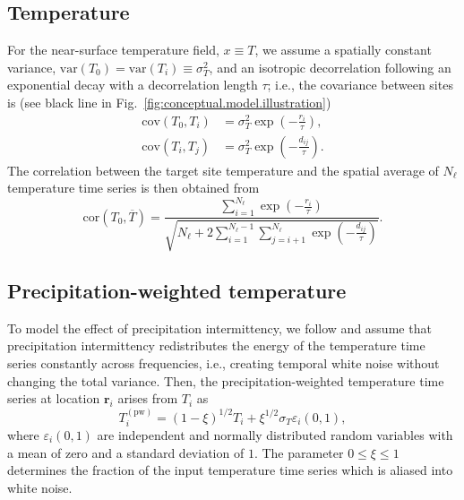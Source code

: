 \documentclass[cp, manuscript]{copernicus}
\begin{document}
\subsection{Temperature}
\label{app:concept.model.t2m}

For the near-surface temperature field, $x \equiv T$, we assume a spatially
constant variance, $\mathrm{var}(T_0)=\mathrm{var}(T_i)\equiv\sigma_T^2$, and an
isotropic decorrelation following an exponential decay with a decorrelation
length $\tau$; i.e., the covariance between sites is (see black line in
Fig.~\ref{fig:conceptual.model.illustration})
%
\begin{align}
\label{eq:t2m.decorr}
\mathrm{cov}(T_0,T_i)&=\sigma_T^2\exp{\left(-\frac{r_i}{\tau}\right)},\\
\mathrm{cov}(T_i,T_j)&=\sigma_T^2\exp{\left(-\frac{d_{ij}}{\tau}\right)}.
\end{align}
%
The correlation between the target site temperature and the spatial average of
$N_{\ell}$ temperature time series is then obtained from
%
\begin{equation}
\label{eq:t2m.corr}
\mathrm{cor}(T_0,\overline{T})=
\frac{\sum_{i=1}^{N_{\ell}}\exp{\left(-\frac{r_i}{\tau}\right)}}
{\sqrt{N_{\ell}+2\sum_{i=1}^{N_{\ell}-1}
\sum_{j=i+1}^{N_{\ell}}{\exp{\left(-\frac{d_{ij}}{\tau}\right)}}}}.
\end{equation}

\subsection{Precipitation-weighted temperature}
\label{app:concept.model.t2m.pw}

To model the effect of precipitation intermittency, we follow
\citet{Laepple2018} and assume that precipitation intermittency redistributes
the energy of the temperature time series constantly across frequencies,
i.e., creating temporal white noise without changing the total variance. Then,
the precipitation-weighted temperature time series at location $\mathbf{r}_i$
arises from $T_i$ as
%
\begin{equation}
\label{eq:precip.weighting}
T_i^{\mathrm{(pw)}}=
\left(1-\xi\right)^{1/2}T_i + \xi^{1/2} \sigma_T \varepsilon_i(0,1),
\end{equation}
%
where $\varepsilon_i(0,1)$ are independent and normally distributed random
variables with a mean of zero and a standard deviation of $1$. The parameter
$0\leq\xi\leq1$ determines the fraction of the input temperature time series
which is aliased into white noise.
\end{document}
